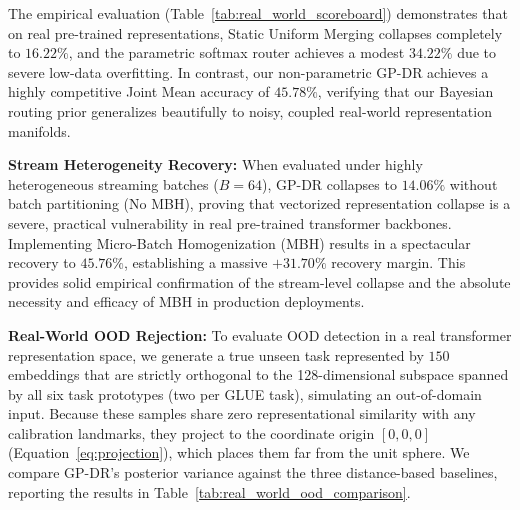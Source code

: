 The empirical evaluation (Table~\ref{tab:real_world_scoreboard}) demonstrates that on real pre-trained representations, Static Uniform Merging collapses completely to $16.22\%$, and the parametric softmax router achieves a modest $34.22\%$ due to severe low-data overfitting. In contrast, our non-parametric GP-DR achieves a highly competitive Joint Mean accuracy of \textbf{$45.78\%$}, verifying that our Bayesian routing prior generalizes beautifully to noisy, coupled real-world representation manifolds.

\textbf{Stream Heterogeneity Recovery:} When evaluated under highly heterogeneous streaming batches ($B=64$), GP-DR collapses to \textbf{$14.06\%$} without batch partitioning (No MBH), proving that vectorized representation collapse is a severe, practical vulnerability in real pre-trained transformer backbones. Implementing Micro-Batch Homogenization (MBH) results in a spectacular recovery to \textbf{$45.76\%$}, establishing a massive \textbf{$+31.70\%$} recovery margin. This provides solid empirical confirmation of the stream-level collapse and the absolute necessity and efficacy of MBH in production deployments.

\textbf{Real-World OOD Rejection:} To evaluate OOD detection in a real transformer representation space, we generate a true unseen task represented by $150$ embeddings that are strictly orthogonal to the 128-dimensional subspace spanned by all six task prototypes (two per GLUE task), simulating an out-of-domain input. Because these samples share zero representational similarity with any calibration landmarks, they project to the coordinate origin $[0, 0, 0]$ (Equation~\ref{eq:projection}), which places them far from the unit sphere. We compare GP-DR's posterior variance against the three distance-based baselines, reporting the results in Table~\ref{tab:real_world_ood_comparison}.

\begin{table}[h]
\caption{Real-world OOD rejection scoreboard on GLUE representation space using a pre-trained BERT-Tiny backbone.}
\label{tab:real_world_ood_comparison}
\vskip 0.15in
\begin{center}
\begin{small}
\begin{sc}
\end{sc}
\end{small}
\end{center}
\vskip -0.1in
\end{table}

